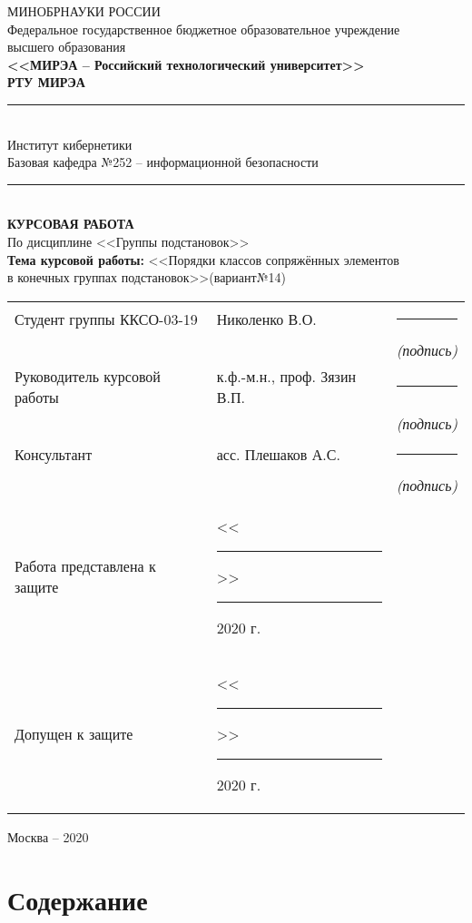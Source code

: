 \documentclass[utf8,14pt,a4paper,oneside,russian]{book}
\makeatletter
\renewcommand{\tableofcontents}{\section*{Содержание}\markboth{Содержание}{}\@starttoc{toc}\newpage}
\makeatother
\begin{document}
	
\thispagestyle{empty}
\small
\begin{center}
	\MakeUppercase{Минобрнауки России}\\[1em]
	Федеральное государственное бюджетное образовательное учреждение\\
	высшего образования\\[0.5em]
	\textbf{<<МИРЭА -- Российский технологический университет>>}\\
	\textbf{РТУ МИРЭА}\\
	\rule{\textwidth}{0.75pt}\\
	Институт кибернетики\\
	Базовая кафедра №252 -- информационной безопасности\\[-0.45em]
	\rule{\textwidth}{0.75pt}\\[5em]
	\normalsize\MakeUppercase{\textbf{Курсовая работа}}\small\\[0.5em]
	По дисциплине <<Группы подстановок>>\\[1.5em]
	\textbf{Тема курсовой работы:} <<Порядки классов сопряжённых элементов\\
	в конечных группах подстановок>>(вариант№14)\\[3em]
	\begin{tabular}{p{7cm}p{6cm}c}
		Студент группы ККСО-03-19 & Николенко В.О. & \rule{2cm}{0.75pt}\\[-0.5em]
		& & \footnotesize\textit{(подпись)}\small\\[1em]
		Руководитель курсовой работы & к.ф.-м.н., проф. Зязин В.П. & \rule{2cm}{0.75pt}\\[-0.5em]
		& & \footnotesize\textit{(подпись)}\small\\[1em]
		Консультант & асс. Плешаков А.С. & \rule{2cm}{0.75pt}\\[-0.5em]
		& & \footnotesize\textit{(подпись)}\small\\[5em]
		Работа представлена к защите & <<\rule{0.5cm}{0.75pt}>> \rule{2cm}{0.75pt} 2020 г. & \\[1em]
		Допущен к защите & <<\rule{0.5cm}{0.75pt}>> \rule{2cm}{0.75pt} 2020 г. & \\[1em]
	\end{tabular}
	\vfill
	Москва -- 2020
\end{center}
\normalsize
\newpage
	
	\tableofcontents
	
\end{document}
